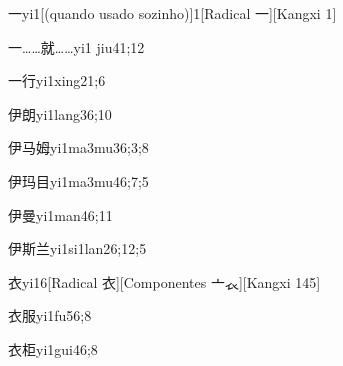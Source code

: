 \begin{verbete}{一}{yi1}[(quando usado sozinho)]{1}[Radical 一][Kangxi 1]
\end{verbete}

\begin{verbete}{一……就……}{yi1 jiu4}{1;12}
\end{verbete}

\begin{verbete}{一行}{yi1xing2}{1;6}
\end{verbete}

\begin{verbete}{伊朗}{yi1lang3}{6;10}
\end{verbete}

\begin{verbete}{伊马姆}{yi1ma3mu3}{6;3;8}
\end{verbete}

\begin{verbete}{伊玛目}{yi1ma3mu4}{6;7;5}
\end{verbete}

\begin{verbete}{伊曼}{yi1man4}{6;11}
\end{verbete}

\begin{verbete}{伊斯兰}{yi1si1lan2}{6;12;5}
\end{verbete}

\begin{verbete}{衣}{yi1}{6}[Radical 衣][Componentes 亠𧘇][Kangxi 145]
\end{verbete}

\begin{verbete}{衣服}{yi1fu5}{6;8}
\end{verbete}

\begin{verbete}{衣柜}{yi1gui4}{6;8}
\end{verbete}

